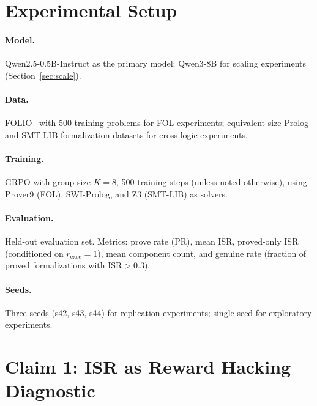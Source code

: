 \documentclass[11pt,twocolumn]{article}
\newcommand{\isr}{\textsc{ISR}}
\newcommand{\pr}{\textsc{PR}}
\newcommand{\grpo}{\textsc{GRPO}}
\begin{document}
\section{Experimental Setup}
\label{sec:setup}

\paragraph{Model.} Qwen2.5-0.5B-Instruct as the primary model; Qwen3-8B for scaling experiments (Section~\ref{sec:scale}).

\paragraph{Data.} FOLIO~\citep{han2022folio} with 500 training problems for FOL experiments; equivalent-size Prolog and SMT-LIB formalization datasets for cross-logic experiments.

\paragraph{Training.} \grpo{} with group size $K{=}8$, 500 training steps (unless noted otherwise), using Prover9 (FOL), SWI-Prolog, and Z3 (SMT-LIB) as solvers.

\paragraph{Evaluation.} Held-out evaluation set. Metrics: prove rate (\pr{}), mean \isr{}, proved-only \isr{} (conditioned on $r_{\text{exec}}{=}1$), mean component count, and genuine rate (fraction of proved formalizations with $\text{ISR} > 0.3$).

\paragraph{Seeds.} Three seeds (s42, s43, s44) for replication experiments; single seed for exploratory experiments.

\section{Claim 1: ISR as Reward Hacking Diagnostic}
\label{sec:claim1}
\end{document}
